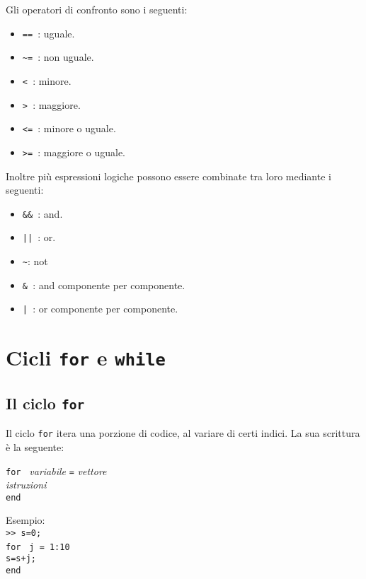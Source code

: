 Gli operatori di confronto sono i seguenti:
\begin{itemize}

	\item	\texttt{== }: uguale.
	\item	\texttt{\textasciitilde= }: non uguale.
	\item	\texttt{< }: minore.
	\item	\texttt{> }: maggiore.
	\item	\texttt{<= }: minore o uguale.
	\item 	\texttt{>= }: maggiore o uguale.

\end{itemize}

Inoltre più espressioni logiche possono essere combinate tra loro mediante i seguenti:
\begin{itemize}

	\item	\texttt{\&\& }: and.
	\item	\texttt{|| }: or.
	\item	\texttt{\textasciitilde }: not
	\item	\texttt{\& }: and componente per componente.
	\item	\texttt{| }: or componente per componente.

\end{itemize}


\section{Cicli \texttt{for} e \texttt{while}}
\subsection{Il ciclo \texttt{for}}
Il ciclo \texttt{for} itera una porzione di codice, al variare di certi indici. La sua scrittura è la seguente:
\begin{center}
\texttt{for } \textit{variabile} \texttt{=} \textit{vettore} \\ 
\hspace{1.5cm}\textit{istruzioni}  \\
\hspace{-3.5cm}\texttt{end}
\end{center}

Esempio: \\
\texttt{>> s=0;} \\
\texttt{for } \texttt{j = 1:10} \\ 
\hspace{1cm}\texttt{s=s+j;}  \\
\texttt{end}

